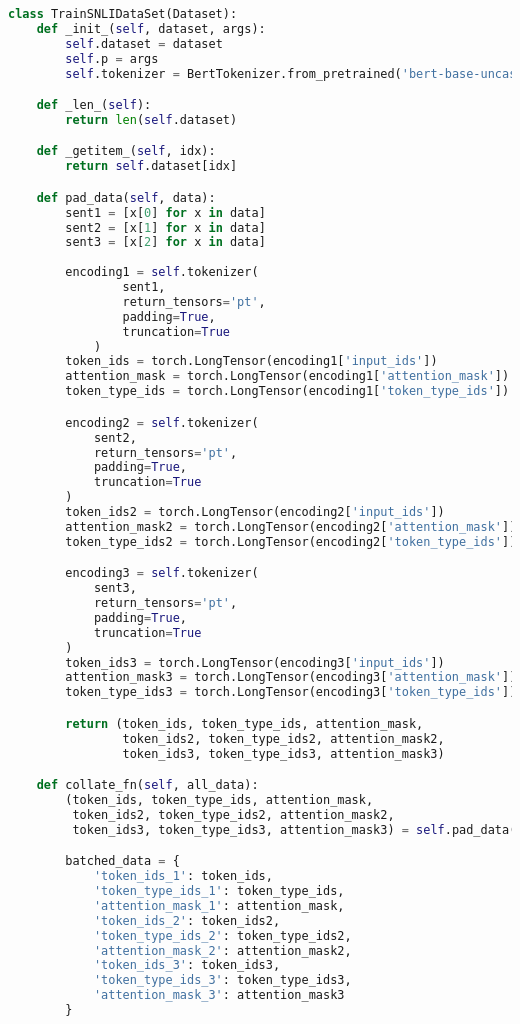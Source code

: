\begin{lstlisting}[language=Python, caption={SNLI Dataset Classes}, label={lst:snli_dataset}, basicstyle=\ttfamily\small, keywordstyle=\color{blue}, commentstyle=\color{green}, stringstyle=\color{red},linewidth=\textwidth]
class TrainSNLIDataSet(Dataset):
    def _init_(self, dataset, args):
        self.dataset = dataset
        self.p = args
        self.tokenizer = BertTokenizer.from_pretrained('bert-base-uncased')

    def _len_(self):
        return len(self.dataset)

    def _getitem_(self, idx):
        return self.dataset[idx]

    def pad_data(self, data):
        sent1 = [x[0] for x in data]
        sent2 = [x[1] for x in data]
        sent3 = [x[2] for x in data]
        
        encoding1 = self.tokenizer(
                sent1,
                return_tensors='pt',
                padding=True,
                truncation=True
            )
        token_ids = torch.LongTensor(encoding1['input_ids'])
        attention_mask = torch.LongTensor(encoding1['attention_mask'])
        token_type_ids = torch.LongTensor(encoding1['token_type_ids'])

        encoding2 = self.tokenizer(
            sent2,
            return_tensors='pt',
            padding=True,
            truncation=True
        )
        token_ids2 = torch.LongTensor(encoding2['input_ids'])
        attention_mask2 = torch.LongTensor(encoding2['attention_mask'])
        token_type_ids2 = torch.LongTensor(encoding2['token_type_ids'])

        encoding3 = self.tokenizer(
            sent3,
            return_tensors='pt',
            padding=True,
            truncation=True
        )
        token_ids3 = torch.LongTensor(encoding3['input_ids'])
        attention_mask3 = torch.LongTensor(encoding3['attention_mask'])
        token_type_ids3 = torch.LongTensor(encoding3['token_type_ids'])

        return (token_ids, token_type_ids, attention_mask,
                token_ids2, token_type_ids2, attention_mask2,
                token_ids3, token_type_ids3, attention_mask3)

    def collate_fn(self, all_data):
        (token_ids, token_type_ids, attention_mask,
         token_ids2, token_type_ids2, attention_mask2,
         token_ids3, token_type_ids3, attention_mask3) = self.pad_data(all_data)

        batched_data = {
            'token_ids_1': token_ids,
            'token_type_ids_1': token_type_ids,
            'attention_mask_1': attention_mask,
            'token_ids_2': token_ids2,
            'token_type_ids_2': token_type_ids2,
            'attention_mask_2': attention_mask2,
            'token_ids_3': token_ids3,
            'token_type_ids_3': token_type_ids3,
            'attention_mask_3': attention_mask3
        }


\end{lstlisting}
